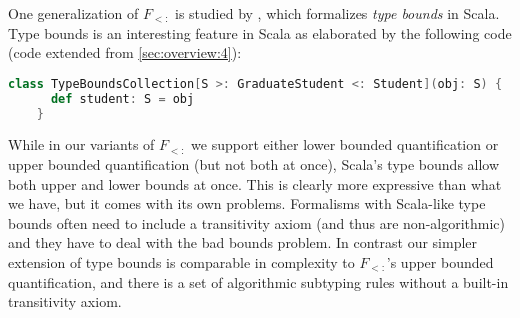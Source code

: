 One generalization of $F_{<:}$ is studied by \cite{amin2017type}, which formalizes
\emph{type bounds} in Scala.
Type bounds is an interesting feature in Scala as elaborated by the following code (code extended from \cref{sec:overview:4}):

\begin{lstlisting}[language=Scala]
	class TypeBoundsCollection[S >: GraduateStudent <: Student](obj: S) {
	  def student: S = obj
	}
\end{lstlisting}

\noindent While in our variants of $F_{<:}$ we support either lower bounded
quantification or upper bounded quantification (but not both at once), Scala's
type bounds allow both upper and lower bounds at once. This is clearly more
expressive than what we have, but it comes with its own problems.
Formalisms with Scala-like type bounds often need to include a transitivity
axiom (and thus are non-algorithmic) and they have to deal with the bad bounds
problem. In contrast our simpler extension of type bounds is comparable
in complexity to $F_{<:}$'s upper bounded quantification, and there is a set of
algorithmic subtyping rules without a built-in transitivity axiom.



